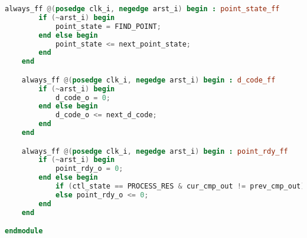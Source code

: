 \begin{lstlisting}[language=Verilog]
	always_ff @(posedge clk_i, negedge arst_i) begin : point_state_ff
		if (~arst_i) begin
			point_state = FIND_POINT;
		end else begin
			point_state <= next_point_state;
		end
	end

	always_ff @(posedge clk_i, negedge arst_i) begin : d_code_ff
		if (~arst_i) begin
			d_code_o = 0;
		end else begin
			d_code_o <= next_d_code;
		end
	end

	always_ff @(posedge clk_i, negedge arst_i) begin : point_rdy_ff
		if (~arst_i) begin
			point_rdy_o = 0;
		end else begin
			if (ctl_state == PROCESS_RES & cur_cmp_out != prev_cmp_out) point_rdy_o <= 1;
			else point_rdy_o <= 0;
		end
	end

endmodule
\end{lstlisting}




\NewPage %
